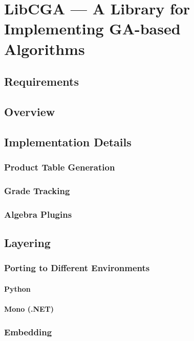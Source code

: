 \chapter{LibCGA --- A Library for Implementing GA-based Algorithms}

\section{Requirements}

\section{Overview}

\section{Implementation Details}

\subsection{Product Table Generation}
\subsection{Grade Tracking}
\subsection{Algebra Plugins}

\section{Layering}

\subsection{Porting to Different Environments}

\subsubsection{Python}
\subsubsection{Mono (.NET)}

\subsection{Embedding}

